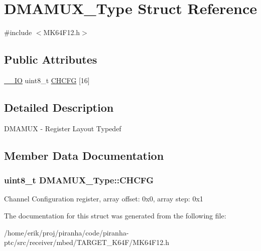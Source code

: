 \hypertarget{structDMAMUX__Type}{}\section{D\+M\+A\+M\+U\+X\+\_\+\+Type Struct Reference}
\label{structDMAMUX__Type}


{\ttfamily \#include $<$M\+K64\+F12.\+h$>$}

\subsection*{Public Attributes}
\begin{DoxyCompactItemize}
\item 
\hyperlink{core__sc300_8h_aec43007d9998a0a0e01faede4133d6be}{\+\_\+\+\_\+\+IO} uint8\+\_\+t \hyperlink{structDMAMUX__Type_a941a4fe7bcfea5b8f0a28912a203b40f}{C\+H\+C\+FG} \mbox{[}16\mbox{]}
\end{DoxyCompactItemize}


\subsection{Detailed Description}
D\+M\+A\+M\+UX -\/ Register Layout Typedef 

\subsection{Member Data Documentation}
\subsubsection[{\texorpdfstring{C\+H\+C\+FG}{CHCFG}}]{ uint8\+\_\+t D\+M\+A\+M\+U\+X\+\_\+\+Type\+::\+C\+H\+C\+FG}\hypertarget{structDMAMUX__Type_a941a4fe7bcfea5b8f0a28912a203b40f}{}\label{structDMAMUX__Type_a941a4fe7bcfea5b8f0a28912a203b40f}
Channel Configuration register, array offset\+: 0x0, array step\+: 0x1 

The documentation for this struct was generated from the following file\+:\begin{DoxyCompactItemize}
\item 
/home/erik/proj/piranha/code/piranha-\/ptc/src/receiver/mbed/\+T\+A\+R\+G\+E\+T\+\_\+\+K64\+F/M\+K64\+F12.\+h\end{DoxyCompactItemize}
